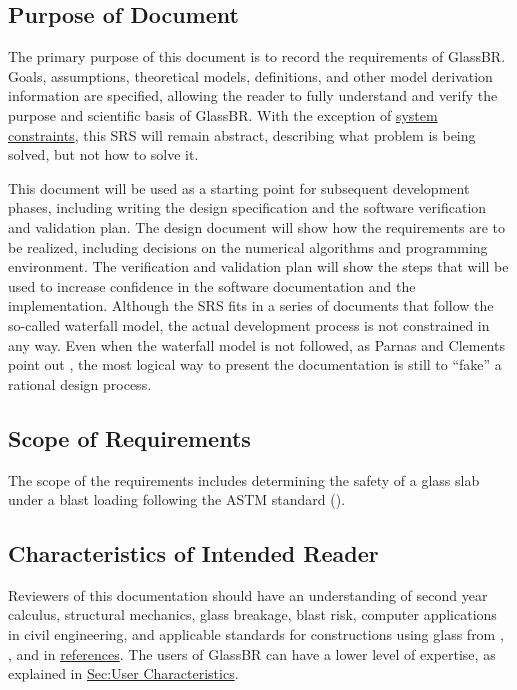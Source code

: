 \documentclass[12pt]{article}
\begin{document}
\subsection{Purpose of Document}
\label{Sec:DocPurpose}
The primary purpose of this document is to record the requirements of GlassBR. Goals, assumptions, theoretical models, definitions, and other model derivation information are specified, allowing the reader to fully understand and verify the purpose and scientific basis of GlassBR. With the exception of \hyperref[Sec:SysConstraints]{system constraints}, this SRS will remain abstract, describing what problem is being solved, but not how to solve it.

This document will be used as a starting point for subsequent development phases, including writing the design specification and the software verification and validation plan. The design document will show how the requirements are to be realized, including decisions on the numerical algorithms and programming environment. The verification and validation plan will show the steps that will be used to increase confidence in the software documentation and the implementation. Although the SRS fits in a series of documents that follow the so-called waterfall model, the actual development process is not constrained in any way. Even when the waterfall model is not followed, as Parnas and Clements point out \cite{parnasClements1986}, the most logical way to present the documentation is still to ``fake'' a rational design process.

\subsection{Scope of Requirements}
\label{Sec:ReqsScope}
The scope of the requirements includes determining the safety of a glass slab under a blast loading following the ASTM standard (\cite{astm2009}).

\subsection{Characteristics of Intended Reader}
\label{Sec:ReaderChars}
Reviewers of this documentation should have an understanding of second year calculus, structural mechanics, glass breakage, blast risk, computer applications in civil engineering, and applicable standards for constructions using glass from \cite{astm2009}, \cite{astm2012}, and \cite{astm2016} in \hyperref[Sec:References]{references}. The users of GlassBR can have a lower level of expertise, as explained in \hyperref[Sec:UserChars]{Sec:User Characteristics}.
\end{document}
